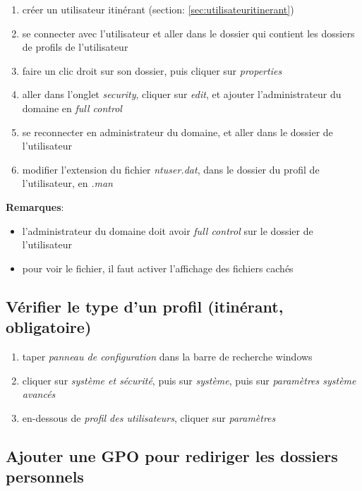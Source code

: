 \documentclass[a4paper]{article}
\begin{document}
\begin{enumerate}
    \item créer un utilisateur itinérant (section: \ref{sec:utilisateuritinerant})
    \item se connecter avec l'utilisateur et aller dans le dossier qui contient les dossiers de profils de l'utilisateur
    \item faire un clic droit sur son dossier, puis cliquer sur \textit{properties}
    \item aller dans l'onglet \textit{security}, cliquer sur \textit{edit}, et ajouter l'administrateur du domaine en \textit{full control}
    \item se reconnecter en administrateur du domaine, et aller dans le dossier de l'utilisateur
    \item modifier l'extension du fichier \textit{ntuser.dat}, dans le dossier du profil de l'utilisateur, en \textit{.man}
\end{enumerate}
\textbf{Remarques}:
\begin{itemize}
    \item l'administrateur du domaine doit avoir \textit{full control} sur le dossier de l'utilisateur
    \item pour voir le fichier, il faut activer l’affichage des fichiers cachés
\end{itemize}





\subsection{Vérifier le type d'un profil (itinérant, obligatoire)}



\begin{enumerate}
    \item taper \textit{panneau de configuration} dans la barre de recherche windows
    \item cliquer sur \textit{système et sécurité}, puis sur \textit{système}, puis sur \textit{paramètres système avancés}
    \item en-dessous de \textit{profil des utilisateurs}, cliquer sur \textit{paramètres}
\end{enumerate}





\subsection{Ajouter une GPO pour rediriger les dossiers personnels}
\end{document}

